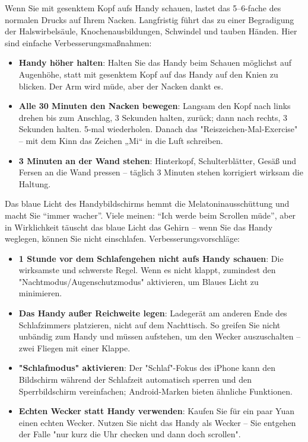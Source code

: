 
Wenn Sie mit gesenktem Kopf aufs Handy schauen, lastet das 5–6-fache des normalen Drucks auf Ihrem Nacken. Langfristig führt das zu einer Begradigung der Halswirbelsäule, Knochenausbildungen, Schwindel und tauben Händen. Hier sind einfache Verbesserungsmaßnahmen:

\begin{itemize}
  \item \textbf{Handy höher halten}: Halten Sie das Handy beim Schauen möglichst auf Augenhöhe, statt mit gesenktem Kopf auf das Handy auf den Knien zu blicken. Der Arm wird müde, aber der Nacken dankt es.
  \item \textbf{Alle 30 Minuten den Nacken bewegen}: Langsam den Kopf nach links drehen bis zum Anschlag, 3 Sekunden halten, zurück; dann nach rechts, 3 Sekunden halten. 5-mal wiederholen. Danach das "Reiszeichen-Mal-Exercise" – mit dem Kinn das Zeichen „Mi“ in die Luft schreiben.
  \item \textbf{3 Minuten an der Wand stehen}: Hinterkopf, Schulterblätter, Gesäß und Fersen an die Wand pressen – täglich 3 Minuten stehen korrigiert wirksam die Haltung.
\end{itemize}


Das blaue Licht des Handybildschirms hemmt die Melatoninausschüttung und macht Sie “immer wacher”. Viele meinen: “Ich werde beim Scrollen müde”, aber in Wirklichkeit täuscht das blaue Licht das Gehirn – wenn Sie das Handy weglegen, können Sie nicht einschlafen. Verbesserungsvorschläge:

\begin{itemize}
  \item \textbf{1 Stunde vor dem Schlafengehen nicht aufs Handy schauen}: Die wirksamste und schwerste Regel. Wenn es nicht klappt, zumindest den "Nachtmodus/Augenschutzmodus" aktivieren, um Blaues Licht zu minimieren.
  \item \textbf{Das Handy außer Reichweite legen}: Ladegerät am anderen Ende des Schlafzimmers platzieren, nicht auf dem Nachttisch. So greifen Sie nicht unbändig zum Handy und müssen aufstehen, um den Wecker auszuschalten – zwei Fliegen mit einer Klappe.
  \item \textbf{"Schlafmodus" aktivieren}: Der "Schlaf"-Fokus des iPhone kann den Bildschirm während der Schlafzeit automatisch sperren und den Sperrbildschirm vereinfachen; Android-Marken bieten ähnliche Funktionen.
  \item \textbf{Echten Wecker statt Handy verwenden}: Kaufen Sie für ein paar Yuan einen echten Wecker. Nutzen Sie nicht das Handy als Wecker – Sie entgehen der Falle "nur kurz die Uhr checken und dann doch scrollen".
\end{itemize}

